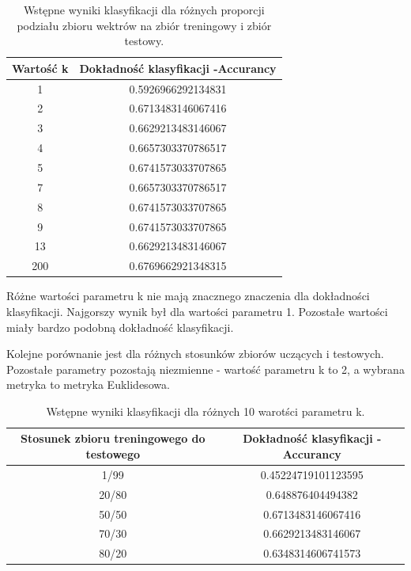 \documentclass{classrep}
\begin{document}
\begin{table}[h!]
 \caption{Wstępne wyniki klasyfikacji dla różnych proporcji podziału zbioru wektrów na zbiór treningowy i zbiór testowy.}
 \centering
 \vspace{0.1cm}
 \begin{tabular}{c c}
  \textbf{Wartość k} & \textbf{Dokładność klasyfikacji -Accurancy}\\
\hline
  1 &  0.5926966292134831\\
  2 &   0.6713483146067416\\
  3 &  0.6629213483146067\\
  4 &  0.6657303370786517\\
  5 &  0.6741573033707865\\
  7 & 0.6657303370786517\\
  8 &  0.6741573033707865\\
  9 &   0.6741573033707865\\
 13  & 0.6629213483146067\\
200 &   0.6769662921348315 \\
 \end{tabular}
 \label{wyniki klasyfikacji dla różnych proporcji podziału zbioru wektrów na zbiór treningowy i zbiór testowy.}
\end{table}

Różne wartości parametru k nie mają znacznego znaczenia dla dokładności klasyfikacji. Najgorszy wynik był dla wartości parametru 1. Pozostałe wartości miały bardzo podobną dokładność klasyfikacji. 

\newpage
Kolejne porównanie jest dla różnych stosunków zbiorów uczących i testowych. Pozostałe parametry pozostają niezmienne - wartość parametru k to 2, a wybrana metryka to metryka Euklidesowa.


\begin{table}[h!]
 \caption{Wstępne wyniki klasyfikacji dla różnych 10 warotści parametru k.}
 \centering
 \vspace{0.1cm}
 \begin{tabular}{c c}
  \textbf{Stosunek zbioru treningowego do testowego} & \textbf{Dokładność klasyfikacji -Accurancy}\\
\hline
  1/99 & 0.45224719101123595\\
  20/80 &  0.648876404494382\\
  50/50 &  0.6713483146067416\\
  70/30 &  0.6629213483146067\\
  80/20 &  0.6348314606741573\\
 \end{tabular}
 \label{wyniki klasyfikacji dla roznych 10 wartosci parametru k}
\end{table}
\end{document}
